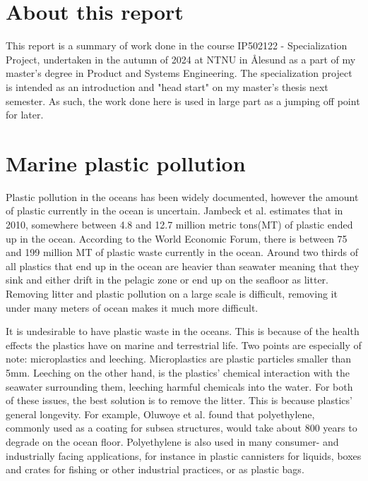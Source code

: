 \documentclass[class=article, crop=false]{standalone}
\begin{document}

\section{About this report}
This report is a summary of work done in the course IP502122 - Specialization Project, undertaken in the autumn of 2024 at NTNU in Ålesund as a part of my master's degree in Product and Systems Engineering. The specialization project is intended as an introduction and "head start" on my master's thesis next semester. As such, the work done here is used in large part as a jumping off point for later.

\section{Marine plastic pollution}
Plastic pollution in the oceans has been widely documented, however the amount of plastic currently in the ocean is uncertain. Jambeck et al.\cite{jambeck_plastic_2015} estimates that in 2010, somewhere between 4.8 and 12.7 million metric tons(MT) of plastic ended up in the ocean. According to the World Economic Forum\cite{world_economic_forum_top_2022}, there is between 75 and 199 million MT of plastic waste currently in the ocean. Around two thirds of all plastics that end up in the ocean are heavier than seawater \cite{isobe_fate_2022} meaning that they sink and either drift in the pelagic zone or end up on the seafloor as litter. Removing litter and plastic pollution on a large scale is difficult, removing it under many meters of ocean makes it much more difficult. 

It is undesirable to have plastic waste in the oceans. This is because of the health effects the plastics have on marine and terrestrial life. Two points are especially of note: microplastics and leeching. Microplastics are plastic particles smaller than 5mm. Leeching on the other hand, is the plastics' chemical interaction with the seawater surrounding them, leeching harmful chemicals into the water.\cite{prata_environmental_2020}\cite{zolotova_harmful_2022}\cite{segovia-mendoza_how_2020}\cite{obuzor_chemical_2023} For both of these issues, the best solution is to remove the litter. This is because plastics' general longevity. For example, Oluwoye et al. \cite{oluwoye_degradation_2023} found that polyethylene, commonly used as a coating for subsea structures, would take about 800 years to degrade on the ocean floor. Polyethylene is also used in many consumer- and industrially facing applications, for instance in plastic cannisters for liquids, boxes and crates for fishing or other industrial practices, or as plastic bags. 
\end{document}
